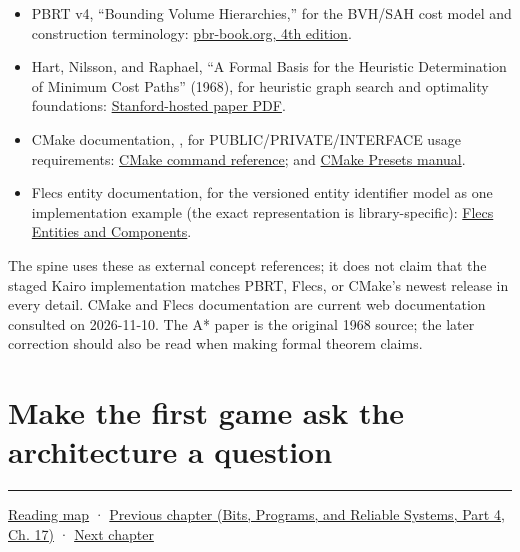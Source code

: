 \begin{itemize}
\tightlist
\item
  PBRT v4, ``Bounding Volume Hierarchies,'' for the BVH/SAH cost model and construction terminology: \href{https://www.pbr-book.org/4ed/Primitives_and_Intersection_Acceleration/Bounding_Volume_Hierarchies}{pbr-book.org, 4th edition}.
\item
  Hart, Nilsson, and Raphael, ``A Formal Basis for the Heuristic Determination of Minimum Cost Paths'' (1968), for heuristic graph search and optimality foundations: \href{https://ai.stanford.edu/~nilsson/OnlinePubs-Nils/PublishedPapers/astar.pdf}{Stanford-hosted paper PDF}.
\item
  CMake documentation, , for PUBLIC/PRIVATE/INTERFACE usage requirements: \href{https://cmake.org/cmake/help/latest/command/target_link_libraries.html}{CMake command reference}; and \href{https://cmake.org/cmake/help/latest/manual/cmake-presets.7.html}{CMake Presets manual}.
\item
  Flecs entity documentation, for the versioned entity identifier model as one implementation example (the exact representation is library-specific): \href{https://www.flecs.dev/flecs/EntitiesComponents.html}{Flecs Entities and Components}.
\end{itemize}

The spine uses these as external concept references; it does not claim that the staged Kairo implementation matches PBRT, Flecs, or CMake's newest release in every detail. CMake and Flecs documentation are current web documentation consulted on 2026-11-10. The A* paper is the original 1968 source; the later correction should also be read when making formal theorem claims.

\section{Make the first game ask the architecture a question}\label{05-engine-i-ch008-make-the-first-game-ask-the-architecture-a-question}

\hypertarget{05-engine-i-ch008-make-the-first-game-ask-the-architecture-a-question}{}

\begin{center}\rule{0.5\linewidth}{0.5pt}\end{center}

\hyperref[volume-reading-map]{Reading map} · \href{../01-Bits-Programs-and-Reliable-Systems-P04/main.pdf\#nameddest=05-engine-i-ch007-typed-apis-and-measured-cpu-data-structures}{Previous chapter (Bits, Programs, and Reliable Systems, Part 4, Ch. 17)} · \hyperref[05-engine-i-ch009-player-choices-rules-and-readable-feedback]{Next chapter}
